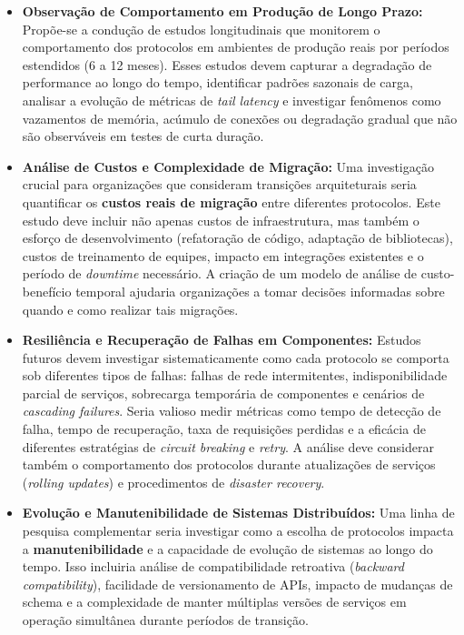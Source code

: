 \begin{itemize}
    \item \textbf{Observação de Comportamento em Produção de Longo Prazo:} Propõe-se a condução de estudos longitudinais que monitorem o comportamento dos protocolos em ambientes de produção reais por períodos estendidos (6 a 12 meses). Esses estudos devem capturar a degradação de performance ao longo do tempo, identificar padrões sazonais de carga, analisar a evolução de métricas de \textit{tail latency} e investigar fenômenos como vazamentos de memória, acúmulo de conexões ou degradação gradual que não são observáveis em testes de curta duração.
    
    \item \textbf{Análise de Custos e Complexidade de Migração:} Uma investigação crucial para organizações que consideram transições arquiteturais seria quantificar os \textbf{custos reais de migração} entre diferentes protocolos. Este estudo deve incluir não apenas custos de infraestrutura, mas também o esforço de desenvolvimento (refatoração de código, adaptação de bibliotecas), custos de treinamento de equipes, impacto em integrações existentes e o período de \textit{downtime} necessário. A criação de um modelo de análise de custo-benefício temporal ajudaria organizações a tomar decisões informadas sobre quando e como realizar tais migrações.
    
    \item \textbf{Resiliência e Recuperação de Falhas em Componentes:} Estudos futuros devem investigar sistematicamente como cada protocolo se comporta sob diferentes tipos de falhas: falhas de rede intermitentes, indisponibilidade parcial de serviços, sobrecarga temporária de componentes e cenários de \textit{cascading failures}. Seria valioso medir métricas como tempo de detecção de falha, tempo de recuperação, taxa de requisições perdidas e a eficácia de diferentes estratégias de \textit{circuit breaking} e \textit{retry}. A análise deve considerar também o comportamento dos protocolos durante atualizações de serviços (\textit{rolling updates}) e procedimentos de \textit{disaster recovery}.
    
    \item \textbf{Evolução e Manutenibilidade de Sistemas Distribuídos:} Uma linha de pesquisa complementar seria investigar como a escolha de protocolos impacta a \textbf{manutenibilidade} e a capacidade de evolução de sistemas ao longo do tempo. Isso incluiria análise de compatibilidade retroativa (\textit{backward compatibility}), facilidade de versionamento de APIs, impacto de mudanças de schema e a complexidade de manter múltiplas versões de serviços em operação simultânea durante períodos de transição.
\end{itemize}